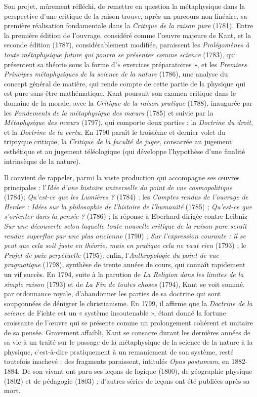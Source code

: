 Son projet, mûrement réfléchi, de
remettre en question la métaphysique
dans la perspective d’une critique de la
raison trouve, après un parcours non
linéaire, sa première réalisation fondamentale
dans la {\it Critique de la raison pure}
(1781). Entre la première édition de l’ouvrage,
considéré comme l’œuvre majeure
de Kant, et la seconde édition (1787),
considérablement modifiée, paraissent les
{\it Prolégomènes à toute métaphysique future
qui pourra se présenter comme science}
(1783), qui présentent sa théorie sous la
forme d’« exercices préparatoires », et les
{\it Premiers Principes métaphysiques de la
science de la nature} (1786), une analyse du
concept général de matière, qui rende
compte de cette partie de la physique qui
est pure sans être mathématique. Kant
poursuit son examen critique dans le
domaine de la morale, avec la {\it Critique de
la raison pratique} (1788), inaugurée par
les {\it Fondements de la métaphysique des
mœurs} (1785) et suivie par la {\it Métaphysique
des mœurs} (1797), qui comporte
deux parties : la {\it Doctrine du droit}, et la
{\it Doctrine de la vertu}. En 1790 paraît le
troisième et dernier volet du triptyque critique,
la {\it Critique de la faculté de juger},
consacrée au jugement esthétique et au
jugement téléologique (qui développe
l’hypothèse d’une finalité intrinsèque de
la nature).

Il convient de rappeler, parmi la vaste
production qui accompagne ses œuvres
principales : l’{\it Idée d’une histoire universelle
du point de vue cosmopolitique}
(1784); {\it Qu'est-ce que les Lumières ?}
(1784) ; les {\it Comptes rendus de l'ouvrage
de Herder : Idées sur la philosophie de
l’histoire de l'humanité} (1785) ; {\it Qu'est-ce
que s'orienter dans la pensée ?} (1786) ; la
réponse à Eberhard dirigée contre Leibniz
{\it Sur une découverte selon laquelle toute
nouvelle critique de la raison pure serait
rendue superflue par une plus ancienne}
(1790) ; {\it Sur l'expression courante : il se
peut que cela soit juste en théorie, mais en
pratique cela ne vaut rien} (1793) ; le {\it Projet
de paix perpétuelle} (1795); enfin,
l’{\it Anthropologie du point de vue pragmatique}
(1798), synthèse de trente années de
cours, qui connaît rapidement un vif
succès. En 1794, suite à la parution de {\it La
Religion dans les limites de la simple raison}
(1793) et de {\it La Fin de toutes choses}
(1794), Kant se voit sommé, par ordonnance
royale, d'abandonner les parties de
sa doctrine qui sont soupçonnées de dénigrer
le christianisme. En 1799, il affirme
que la {\it Doctrine de la science} de Fichte est
un « système insoutenable », étant donné
la fortune croissante de l’œuvre qui se
présente comme un prolongement cohérent
et unitaire de sa pensée. Gravement
affaibli, Kant se consacre durant les dernières
années de sa vie à un traité sur le
passage de la métaphysique de la science
de la nature à la physique, c’est-à-dire
pratiquement à un remaniement de son
système, resté toutefois inachevé : des
fragments paraissent, intitulés {\it Opus postumum},
en 1882-1884. De son vivant ont
paru ses leçons de logique (1800), de géographie
physique (1802) et de pédagogie
(1803) ; d’autres séries de leçons ont été
publiées après sa mort.

